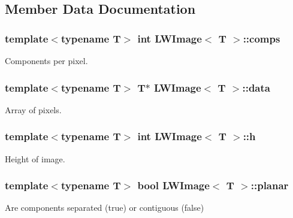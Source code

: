 \subsection{Member Data Documentation}
\hypertarget{classLWImage_afe32b723621c8269897d9a58255bfa86}{}
\subsubsection[{comps}]{\setlength{\rightskip}{0pt plus 5cm}template$<$typename T$>$ int {\bf L\+W\+Image}$<$ T $>$\+::comps}\label{classLWImage_afe32b723621c8269897d9a58255bfa86}


Components per pixel. 

\hypertarget{classLWImage_a97a679b4f4133084fc8afbaa029c3fef}{}
\subsubsection[{data}]{\setlength{\rightskip}{0pt plus 5cm}template$<$typename T$>$ T$\ast$ {\bf L\+W\+Image}$<$ T $>$\+::data}\label{classLWImage_a97a679b4f4133084fc8afbaa029c3fef}


Array of pixels. 

\hypertarget{classLWImage_a2b5a9db633a94baec577a6db13a96240}{}
\subsubsection[{h}]{\setlength{\rightskip}{0pt plus 5cm}template$<$typename T$>$ int {\bf L\+W\+Image}$<$ T $>$\+::h}\label{classLWImage_a2b5a9db633a94baec577a6db13a96240}


Height of image. 

\hypertarget{classLWImage_ae63104e4602e8801d97407207103728c}{}
\subsubsection[{planar}]{\setlength{\rightskip}{0pt plus 5cm}template$<$typename T$>$ bool {\bf L\+W\+Image}$<$ T $>$\+::planar}\label{classLWImage_ae63104e4602e8801d97407207103728c}


Are components separated (true) or contiguous (false) 

